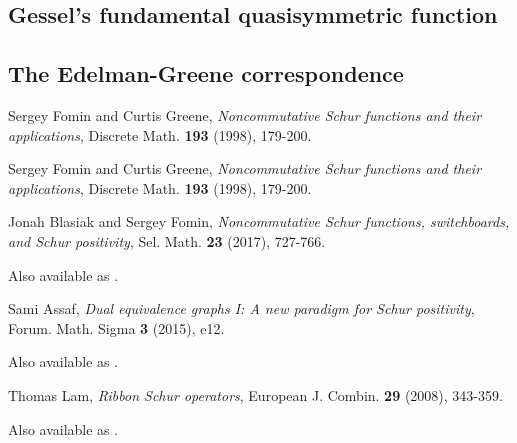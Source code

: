 \documentclass{article}
\begin{document}
\subsection{Gessel's fundamental quasisymmetric function}

\subsection{The Edelman-Greene correspondence}

\begin{thebibliography}{999999}
    \raggedright\footnotesize

    Sergey Fomin and Curtis Greene, 
    \textit{Noncommutative Schur functions and their applications}, 
    Discrete Math. \textbf{193} (1998), 179-200.

    Sergey Fomin and Curtis Greene, 
    \textit{Noncommutative Schur functions and their applications}, 
    Discrete Math. \textbf{193} (1998), 179-200.

    Jonah Blasiak and Sergey Fomin, 
    \textit{Noncommutative Schur functions, switchboards, and Schur positivity},
    Sel. Math. \textbf{23} (2017), 727-766.

    Also available as .

    Sami Assaf,
    \textit{Dual equivalence graphs I: A new paradigm for Schur positivity},
    Forum. Math. Sigma \textbf{3} (2015), e12.

    Also available as .

    Thomas Lam,
    \textit{Ribbon Schur operators},
    European J. Combin. \textbf{29} (2008), 343-359.

    Also available as .



\end{thebibliography}
\end{document}
